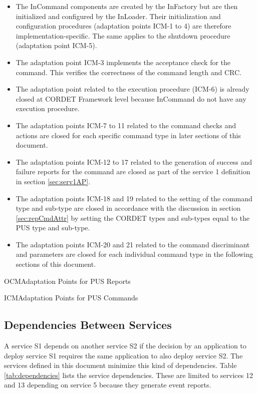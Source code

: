 \documentclass{pnp_article}
\begin{document}
\begin{itemize}
\item The InCommand components are created by the InFactory but are then initialized and configured by the InLoader. Their initialization and configuration procedures (adaptation points ICM-1 to 4) are therefore implementation-specific. The same applies to the shutdown procedure (adaptation point ICM-5).
\item The adaptation point ICM-3 implements the acceptance check for the command. This verifies the correctness of the command length and CRC.
\item The adaptation point related to the execution procedure (ICM-6) is already closed at CORDET Framework level because InCommand do not have any execution procedure.
\item The adaptation points ICM-7 to 11 related to the command checks and actions are closed for each specific command type in later sections of this document.
\item The adaptation points ICM-12 to 17 related to the generation of success and failure reports for the command are closed as part of the service 1 definition in section \ref{sec:serv1AP}.
\item The adaptation points ICM-18 and 19 related to the setting of the command type and sub-type are closed in accordance with the discussion in section \ref{sec:repCmdAttr} by setting the CORDET types and sub-types equal to the PUS type and sub-type.
\item The adaptation points ICM-20 and 21 related to the command discriminant and parameters are closed for each individual command type in the following sections of this document.
\end{itemize}

\begin{crAp}{OCM}{Adaptation Points for PUS Reports}
\end{crAp}

\newpage
\begin{crAp}{ICM}{Adaptation Points for PUS Commands}
\end{crAp}

\subsection{Dependencies Between Services}\label{sec:dependencies}
A service S1 depends on another service S2 if the decision by an application to deploy service S1 requires the same application to also deploy service S2. The services defined in this document minimize this kind of dependencies. Table \ref{tab:dependencies} lists the service dependencies. These are limited to services 12 and 13 depending on service 5 because they generate event reports.
\end{document}
